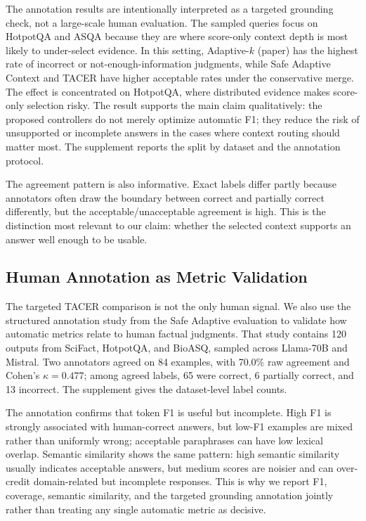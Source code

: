 \documentclass[11pt]{article}
\begin{document}
The annotation results are intentionally interpreted as a targeted grounding check, not a large-scale human evaluation. The sampled queries focus on HotpotQA and ASQA because they are where score-only context depth is most likely to under-select evidence. In this setting, Adaptive-$k$ (paper) has the highest rate of incorrect or not-enough-information judgments, while Safe Adaptive Context and TACER have higher acceptable rates under the conservative merge. The effect is concentrated on HotpotQA, where distributed evidence makes score-only selection risky. The result supports the main claim qualitatively: the proposed controllers do not merely optimize automatic F1; they reduce the risk of unsupported or incomplete answers in the cases where context routing should matter most. The supplement reports the split by dataset and the annotation protocol.

The agreement pattern is also informative. Exact labels differ partly because annotators often draw the boundary between correct and partially correct differently, but the acceptable/unacceptable agreement is high. This is the distinction most relevant to our claim: whether the selected context supports an answer well enough to be usable.

\subsection{Human Annotation as Metric Validation}

The targeted TACER comparison is not the only human signal. We also use the structured annotation study from the Safe Adaptive evaluation to validate how automatic metrics relate to human factual judgments. That study contains 120 outputs from SciFact, HotpotQA, and BioASQ, sampled across Llama-70B and Mistral. Two annotators agreed on 84 examples, with 70.0\% raw agreement and Cohen's $\kappa=0.477$; among agreed labels, 65 were correct, 6 partially correct, and 13 incorrect. The supplement gives the dataset-level label counts.

The annotation confirms that token F1 is useful but incomplete. High F1 is strongly associated with human-correct answers, but low-F1 examples are mixed rather than uniformly wrong; acceptable paraphrases can have low lexical overlap. Semantic similarity shows the same pattern: high semantic similarity usually indicates acceptable answers, but medium scores are noisier and can over-credit domain-related but incomplete responses. This is why we report F1, coverage, semantic similarity, and the targeted grounding annotation jointly rather than treating any single automatic metric as decisive.
\end{document}

